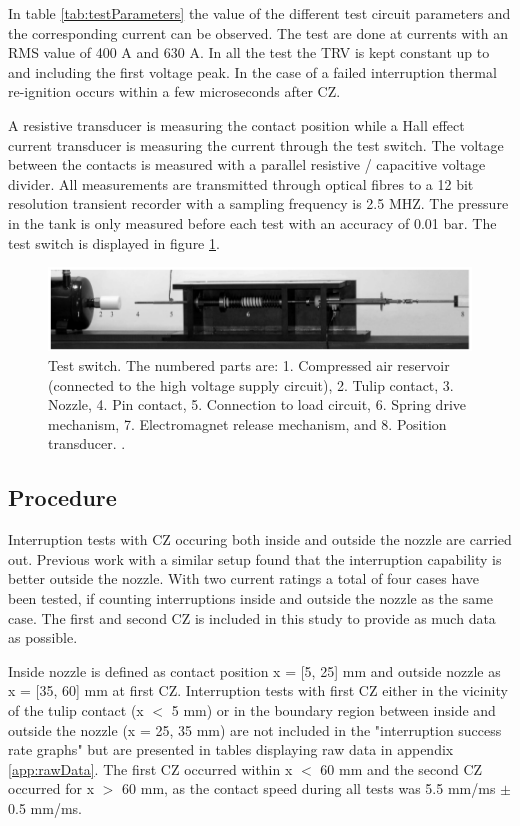 \documentclass[10pt,a4paper,twoside]{article}
\begin{document}
In table \ref{tab:testParameters} the value of the different test circuit parameters and the corresponding current can be observed. The test are done at currents with an RMS value of 400 A and 630 A. In all the test the TRV is kept constant up to and including the first voltage peak. In the case of a failed interruption thermal re-ignition occurs within a few microseconds after CZ.

A resistive transducer is measuring the contact position while a Hall effect current transducer is measuring the current through the test switch. The voltage between the contacts is measured with a parallel resistive / capacitive voltage divider. All measurements are transmitted through optical fibres to a 12 bit resolution transient recorder with a sampling frequency is 2.5 MHZ. The pressure in the tank is only measured before each test with an accuracy of 0.01 bar. The test switch is displayed in figure \ref{fig:testSwitchRiggEq}.

\begin{figure} [H]
\centering
\includegraphics[scale=0.5]{Bilder/Method/switchTest.png}
\caption{Test switch. The numbered parts are: 1. Compressed air reservoir (connected to the high voltage supply circuit), 2. Tulip contact, 3. Nozzle, 4. Pin
contact, 5. Connection to load circuit, 6. Spring drive mechanism, 7. Electromagnet release mechanism, and 8. Position transducer. \cite{bib:AFIMVLBA}.} \label{fig:testSwitchRiggEq}
\end{figure}

\newpage
\subsection{Procedure} \label{sec:procedure}
Interruption tests with CZ occuring both inside and outside the nozzle are carried out. Previous work with a similar setup found that the interruption capability is better outside the nozzle. With two current ratings a total of four cases have been tested, if counting interruptions inside and outside the nozzle as the same case. The first and second CZ is included in this study to provide as much data as possible.

Inside nozzle is defined as contact position x = [5, 25] mm and outside nozzle as x = [35, 60] mm at first CZ. Interruption tests with first CZ either in the vicinity of the tulip contact (x $<$ 5 mm) or in the boundary region between inside and outside the nozzle (x = 25, 35 mm) are not included in the "interruption success rate graphs" but are presented in tables displaying raw data in appendix \ref{app:rawData}. The first CZ occurred within x $<$ 60 mm and the second CZ occurred for x $>$ 60 mm, as the contact speed during all tests was 5.5 mm/ms $\pm$ 0.5 mm/ms.
\end{document}

